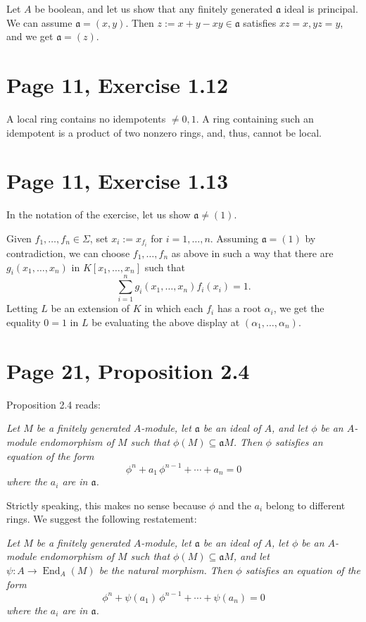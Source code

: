 \documentclass[parskip=half]{scrartcl}%
\newcommand{\oo}{\operatorname}
\newcommand{\mf}{\mathfrak}
\newcommand{\aaa}{\mf a}
\begin{document}
Let $A$ be boolean, and let us show that any finitely generated $\aaa$ ideal is principal. We can assume $\aaa=(x,y)$. Then $z:=x+y-xy\in\aaa$ satisfies $xz=x,yz=y$, and we get $\aaa=(z)$.

\section{Page 11, Exercise 1.12}%

A local ring contains no idempotents $\neq0,1$. A ring containing such an idempotent is a product of two nonzero rings, and, thus, cannot be local.

\section{Page 11, Exercise 1.13}%

In the notation of the exercise, let us show $\aaa\neq(1)$. 

Given $f_1,\dots,f_n\in\Sigma$, set $x_i:=x_{f_i}$ for $i=1,\dots,n$. Assuming $\aaa=(1)$ by contradiction, we can choose $f_1,\dots,f_n$ as above in such a way that there are $g_i(x_1,\dots,x_n)$ in $K[x_1,\dots,x_n]$ such that 
$$
\sum_{i=1}^n g_i(x_1,\dots,x_n)f_i(x_i)=1.
$$ 
Letting $L$ be an extension of $K$ in which each $f_i$ has a root $\alpha_i$, we get the equality $0=1$ in $L$ be evaluating the above display at $(\alpha_1,\dots,\alpha_n)$.

\section{Page 21, Proposition 2.4}%

Proposition 2.4 reads:

\emph{Let $M$ be a finitely generated $A$-module, let $\mf a$ be an ideal of $A$, and let $\phi$ be an $A$-module endomorphism of $M$ such that $\phi(M)\subseteq\mf a M$. Then $\phi$ satisfies an equation of the form
$$
\phi^n+a_1\,\phi^{n-1}+\cdots+a_n=0
$$ 
where the $a_i$ are in $\mf a$.}

Strictly speaking, this makes no sense because $\phi$ and the $a_i$ belong to different rings. We suggest the following restatement:

\emph{Let $M$ be a finitely generated $A$-module, let $\mf a$ be an ideal of $A$, let $\phi$ be an $A$-module endomorphism of $M$ such that $\phi(M)\subseteq\mf a M$, and let $\psi:A\to\oo{End}_A(M)$ be the natural morphism. Then $\phi$ satisfies an equation of the form
$$
\phi^n+\psi(a_1)\,\phi^{n-1}+\cdots+\psi(a_n)=0
$$ 
where the $a_i$ are in $\mf a$.}
\end{document}
